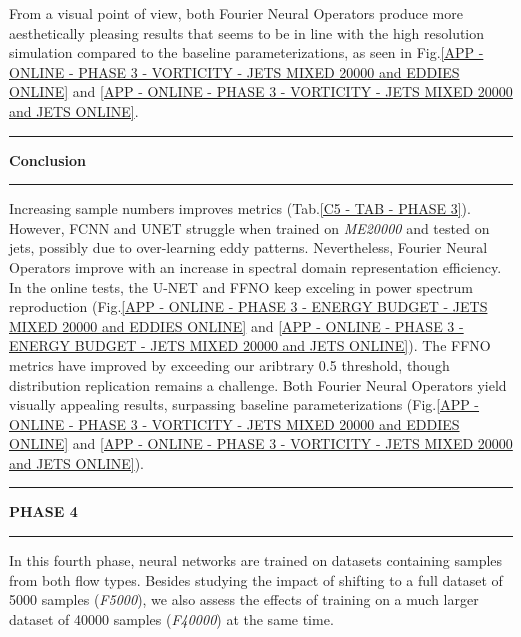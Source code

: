 From a visual point of view, both Fourier Neural Operators produce more aesthetically pleasing results that seems to be in line with the high resolution simulation compared to the baseline parameterizations, as seen in Fig.\ref{APP - ONLINE - PHASE 3 - VORTICITY - JETS MIXED 20000 and EDDIES ONLINE} and \ref{APP - ONLINE - PHASE 3 - VORTICITY - JETS MIXED 20000 and JETS ONLINE}.\\


\rule[0cm]{\linewidth}{0.025cm}
\begin{center}
\small \textbf{Conclusion}
\end{center}
\rule[0.3cm]{\linewidth}{0.025cm}

Increasing sample numbers improves metrics (Tab.\ref{C5 - TAB - PHASE 3}). However, FCNN and UNET struggle when trained on \textit{ME20000} and tested on jets, possibly due to over-learning eddy patterns. Nevertheless, Fourier Neural Operators improve with an increase in spectral domain representation efficiency. In the online tests, the U-NET and FFNO keep exceling in power spectrum reproduction (Fig.\ref{APP - ONLINE - PHASE 3 - ENERGY BUDGET -  JETS MIXED 20000 and EDDIES ONLINE} and \ref{APP - ONLINE - PHASE 3 - ENERGY BUDGET -  JETS MIXED 20000 and JETS ONLINE}). The FFNO metrics have improved by exceeding our aribtrary 0.5 threshold, though distribution replication remains a challenge. Both Fourier Neural Operators yield visually appealing results, surpassing baseline parameterizations (Fig.\ref{APP - ONLINE - PHASE 3 - VORTICITY - JETS MIXED 20000 and EDDIES ONLINE} and \ref{APP - ONLINE - PHASE 3 - VORTICITY - JETS MIXED 20000 and JETS ONLINE}).


\newpage



%
%
\newpage
\rule[0cm]{\linewidth}{0.075cm}
\begin{center}
\Large \textbf{PHASE 4}
\end{center}
\vspace{0.15cm}
\rule[0.3cm]{\linewidth}{0.075cm}

In this fourth phase, neural networks are trained on datasets containing samples from both flow types. Besides studying the impact of shifting to a full dataset of 5000 samples (\textit{F5000}), we also assess the effects of training on a much larger dataset of 40000 samples (\textit{F40000}) at the same time.\\

